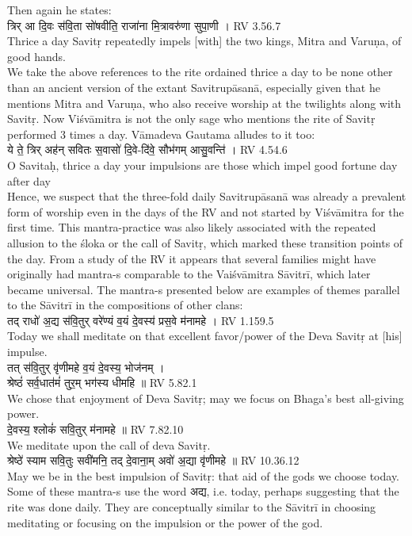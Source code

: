 \documentclass[12pt]{article}
\begin{document}
Then again he states:\\[8pt]
{\skt त्रिर् आ दि॒वः स॑वि॒ता सो॑षवीति॒ राजा॑ना मि॒त्रावरु॑णा सुपा॒णी ।
}RV 3.56.7 \\[8pt]
Thrice a day Savitṛ repeatedly impels [with] the two kings, Mitra and Varuṇa, of good hands.\\[8pt]
We take the above references to the rite ordained thrice a day to be none other than an ancient version of the extant Savitrupāsanā, especially given that he mentions Mitra and Varuṇa, who also receive worship at the twilights along with Savitṛ. Now Viśvāmitra is not the only sage who mentions the rite of Savitṛ performed 3 times a day. Vāmadeva Gautama alludes to it too:\\[8pt]

{\skt ये ते॒ त्रिर् अह॑न् सवितः स॒वासो॑ दि॒वे-दि॑वे॒ सौभ॑गम् आसु॒वन्ति॑ ।
}RV 4.54.6\\[8pt]
O Savitaḥ, thrice a day your impulsions are those which impel good fortune day after day\\[8pt]
Hence, we suspect that the three-fold daily Savitrupāsanā was already a prevalent form of worship even in the days of the RV and not started by Viśvāmitra for the first time. This mantra-practice was also likely associated with the repeated allusion to the śloka or the call of Savitṛ, which marked these transition points of the day. From a study of the RV it appears that several families might have originally had mantra-s comparable to the Vaiśvāmitra Sāvitrī, which later became universal. The mantra-s presented below are examples of themes parallel to the Sāvitrī in the compositions of other clans:\\[8pt]
{\skt  तद् राधो॑ अ॒द्य स॑वि॒तुर् वरे॑ण्यं व॒यं दे॒वस्य॑ प्रस॒वे म॑नामहे ।
}RV 1.159.5\\[8pt]
Today we shall meditate on that excellent favor/power of the Deva Savitṛ at [his] impulse.\\[8pt]
{\skt  तत् स॑वि॒तुर् वृ॑णीमहे व॒यं दे॒वस्य॒ भोज॑नम् ।\\
श्रेष्ठं॑ सर्व॒धात॑मं॑ तुर॒म् भग॑स्य धीमहि ॥
} RV 5.82.1\\[8pt]
We chose that enjoyment of Deva Savitṛ; may we focus on Bhaga's best all-giving power.\\[8pt]
{\skt दे॒वस्य॒ श्लोकं॑ सवि॒तुर् म॑नामहे ॥
} RV 7.82.10\\[8pt]
We meditate upon the call of  deva Savitṛ.\\[8pt]
{\skt श्रेष्ठे॑ स्याम सवि॒तुः सवी॑मनि॒ तद् दे॒वाना॒म् अवो॑ अ॒द्या वृ॑णीमहे ॥
} RV 10.36.12\\[8pt]
May we be in the best impulsion of Savitṛ: that aid of the gods we choose today.\\[8pt]
Some of these mantra-s use the word {\skt अद्य}, i.e. today, perhaps suggesting that the rite was done daily. They are conceptually similar to the Sāvitrī in choosing meditating or focusing on the impulsion or the power of the god.
\end{document}
